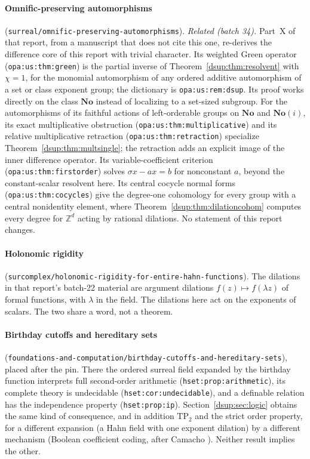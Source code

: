 \documentclass[11pt,oneside]{article}
\numberwithin{equation}{section}
\theoremstyle{definition}
\theoremstyle{remark}
\newcommand{\No}{\mathbf{No}}
\newcommand{\SC}{\No(i)}
\newcommand{\Z}{\mathbb Z}
\newcommand{\repo}[1]{\nolinkurl{#1}}%
\newcommand{\lbl}[1]{\nolinkurl{#1}}%
\begin{document}
\paragraph{Omnific-preserving automorphisms}
(\repo{surreal/omnific-preserving-automorphisms}). \emph{Related (batch 34).}
Part~X of that report, from a manuscript that does not cite this one,
re-derives the difference core of this report with trivial character. Its
weighted Green operator (\lbl{opa:us:thm:green}) is the partial inverse of
Theorem~\ref{dsup:thm:resolvent} with $\chi=1$, for the monomial automorphism
of any ordered additive automorphism of a set or class exponent group; the
dictionary is \lbl{opa:us:rem:dsup}. Its proof works directly on the class
$\No$ instead of localizing to a set-sized subgroup. For the automorphisms of
its faithful actions of left-orderable groups on $\No$ and $\SC$, its exact
multiplicative obstruction (\lbl{opa:us:thm:multiplicative}) and its relative
multiplicative retraction (\lbl{opa:us:thm:retraction}) specialize
Theorem~\ref{dsup:thm:multsingle}; the retraction adds an explicit image of
the inner difference operator. Its variable-coefficient criterion
(\lbl{opa:us:thm:firstorder}) solves $\sigma x-ax=b$ for nonconstant $a$,
beyond the constant-scalar resolvent here. Its central cocycle normal forms
(\lbl{opa:us:thm:cocycles}) give the degree-one cohomology for every group
with a central nonidentity element, where
Theorem~\ref{dsup:thm:dilationcohom} computes every degree for $\Z^d$ acting
by rational dilations. No statement of this report changes.

\paragraph{Holonomic rigidity}
(\repo{surcomplex/holonomic-rigidity-for-entire-hahn-functions}). The
dilations in that report's batch-22 material are argument dilations
$f(z)\mapsto f(\lambda z)$ of formal functions, with $\lambda$ in the field.
The dilations here act on the exponents of scalars. The two share a word,
not a theorem.

\paragraph{Birthday cutoffs and hereditary sets}
(\repo{foundations-and-computation/birthday-cutoffs-and-hereditary-sets}),
placed after the pin. There the ordered surreal field expanded by the
birthday function interprets full second-order arithmetic
(\lbl{hset:prop:arithmetic}), its complete theory is undecidable
(\lbl{hset:cor:undecidable}), and a definable relation has the independence
property (\lbl{hset:prop:ip}). Section~\ref{dsup:sec:logic} obtains the same
kind of consequence, and in addition $\mathrm{TP}_2$ and the strict order
property, for a different expansion (a Hahn field with one exponent
dilation) by a different mechanism (Boolean coefficient coding, after
Camacho \cite{Camacho}). Neither result implies the other.
\end{document}
